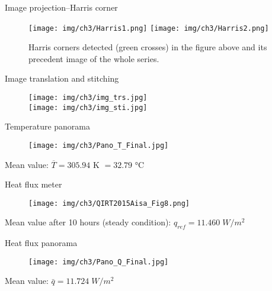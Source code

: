 \begin{frame}{Image projection--\small{Harris corner}}
    \begin{figure}
        \hspace*{-15pt}
        \texttt{[image: img/ch3/Harris1.png]}
        \texttt{[image: img/ch3/Harris2.png]}
        \caption{Harris corners detected (green crosses) in the figure above and its precedent image of the whole series. }
    \end{figure}
\end{frame}


\begin{frame}{Image translation and stitching}
    \begin{figure}
        \centering
        \vspace*{-10pt}
        \texttt{[image: img/ch3/img\_trs.jpg]}\\
        \pause
        \texttt{[image: img/ch3/img\_sti.jpg]}
    \end{figure}
\end{frame}


\begin{frame}{Temperature panorama}
    \begin{figure}
        \hspace*{-15pt}
        \texttt{[image: img/ch3/Pano\_T\_Final.jpg]}
    \end{figure}
    \centering
    Mean value: $ \overline{T} = 305.94$ K $= 32.79$ °C
\end{frame}

\begin{frame}{Heat flux meter}
    \begin{figure}
    \centering
    \vspace*{-18pt}
    \texttt{[image: img/ch3/QIRT2015Aisa\_Fig8.png]}
    \end{figure}
    \pause
    Mean value after 10 hours (steady condition): $q_{ref}=11.460\; W/m^2$
\end{frame}

\begin{frame}{Heat flux panorama}
    \begin{figure}
        \hspace*{-15pt}
        \texttt{[image: img/ch3/Pano\_Q\_Final.jpg]}
    \end{figure}
    \centering
    Mean value: $\bar{q}=11.724\; W/m^2$
\end{frame}


